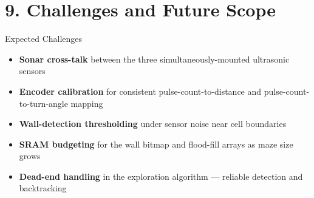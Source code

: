 \documentclass[aspectratio=169,11pt]{beamer}
\newcommand{\highlight}[1]{\textcolor{teal!80!black}{\textbf{#1}}}
\begin{document}
\section{9. Challenges and Future Scope}

\begin{frame}{Expected Challenges}
    \begin{itemize}
        \item \highlight{Sonar cross-talk} between the three simultaneously-mounted ultrasonic sensors
        \item \highlight{Encoder calibration} for consistent pulse-count-to-distance and pulse-count-to-turn-angle mapping
        \item \highlight{Wall-detection thresholding} under sensor noise near cell boundaries
        \item \highlight{SRAM budgeting} for the wall bitmap and flood-fill arrays as maze size grows
        \item \highlight{Dead-end handling} in the exploration algorithm --- reliable detection and backtracking
    \end{itemize}
\end{frame}
\end{document}
